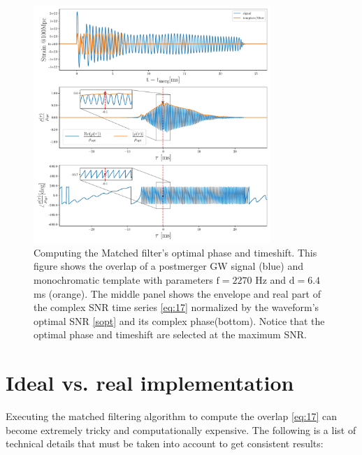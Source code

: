 \begin{figure}[hbt!]
\begin{center}
\includegraphics[width=0.8\textwidth, angle=0]{images/Data_analysis/results/ex_search.pdf}
\captionsetup{width=0.8\textwidth}
\caption[Computing the matched filter's optimal phase and timeshift]{Computing the Matched filter's optimal phase and timeshift. This figure shows the overlap of a postmerger GW signal (blue) and monochromatic template with parameters $\mathrm{f=2270}$ Hz and $\mathrm{d=6.4}$ ms (orange). The middle panel shows the envelope and real part of the complex SNR time series \ref{eq:17} normalized by the waveform's optimal SNR \ref{sopt} and its complex phase(bottom). Notice that the optimal phase and timeshift are selected at the maximum SNR.}
\label{fig:7}
\end{center}
\end{figure}

\FloatBarrier



\section{Ideal vs. real implementation}

Executing the matched filtering algorithm to compute the overlap \ref{eq:17} can become extremely tricky and computationally expensive. The following is a list of technical details that must be taken into account to get consistent results:


